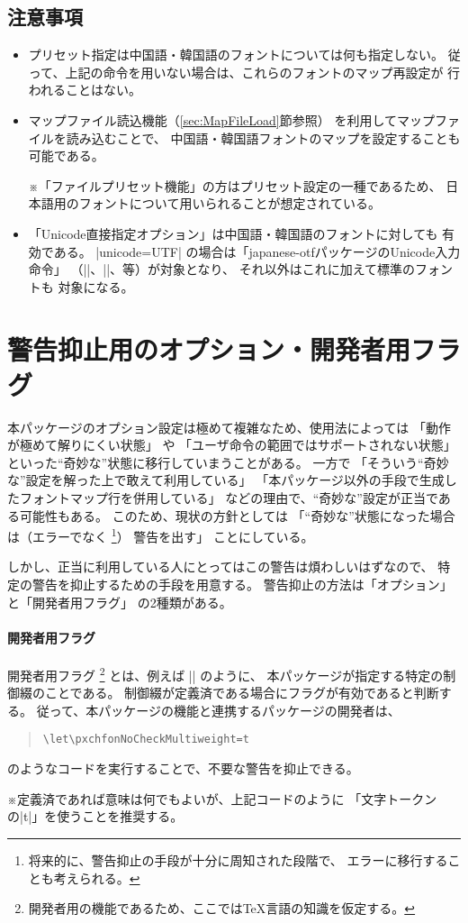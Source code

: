 \documentclass[uplatex,dvipdfmx,a4paper]{jsarticle}
\newcommand{\Pkg}[1]{\textsf{#1}}
\newcommand{\Note}{\par\noindent ※}
\providecommand{\Strong}[1]{\textsf{#1}}
\begin{document}
\subsection{注意事項}

\begin{itemize}
\item プリセット指定は中国語・韓国語のフォントについては何も指定しない。
従って、上記の命令を用いない場合は、これらのフォントのマップ再設定が
行われることはない。
\item マップファイル読込機能（\ref{sec:MapFileLoad}節参照）
を利用してマップファイルを読み込むことで、
中国語・韓国語フォントのマップを設定することも可能である。
\Note 「ファイルプリセット機能」の方はプリセット設定の一種であるため、
日本語用のフォントについて用いられることが想定されている。
\item 「Unicode直接指定オプション」は中国語・韓国語のフォントに対しても
有効である。
|unicode=UTF| の場合は「\Pkg{japanese-otf}パッケージのUnicode入力命令」
（|\UTFK|、|\UTFM|、等）が対象となり、
それ以外はこれに加えて{\upTeX}標準のフォントも
対象になる。
\end{itemize}

\section{警告抑止用のオプション・開発者用フラグ}
\label{sec:Suppress-Warnings}

本パッケージのオプション設定は極めて複雑なため、使用法によっては
「動作が極めて解りにくい状態」
や
「ユーザ命令の範囲ではサポートされない状態」
といった“奇妙な”状態に移行していまうことがある。
一方で
「そういう“奇妙な”設定を解った上で敢えて利用している」
「本パッケージ以外の手段で生成したフォントマップ行を併用している」
などの理由で、“奇妙な”設定が正当である可能性もある。
このため、現状の方針としては
「“奇妙な”状態になった場合は（エラーでなく
\footnote{将来的に、警告抑止の手段が十分に周知された段階で、
  エラーに移行することも考えられる。}）
\Strong{警告を出す}」
ことにしている。

しかし、正当に利用している人にとってはこの警告は煩わしいはずなので、
特定の警告を抑止するための手段を用意する。
警告抑止の方法は「オプション」と「開発者用フラグ」
の2種類がある。

\paragraph{開発者用フラグ}
開発者用フラグ
\footnote{開発者用の機能であるため、ここでは{\TeX}言語の知識を仮定する。}
とは、例えば |\pxchfonNoCheckMultiweight| のように、
本パッケージが指定する特定の制御綴のことである。
制御綴が\Strong{定義済である}場合にフラグが有効であると判断する。
従って、本パッケージの機能と連携するパッケージの開発者は、
\begin{quote}\small\begin{verbatim}
\let\pxchfonNoCheckMultiweight=t
\end{verbatim}\end{quote}
のようなコードを実行することで、不要な警告を抑止できる。
\Note 定義済であれば意味は何でもよいが、上記コードのように
「文字トークンの|t|」を使うことを推奨する。
\end{document}

